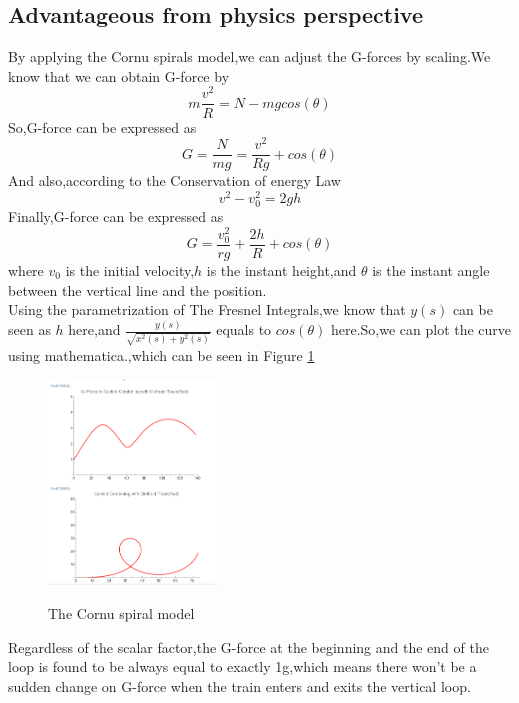 \documentclass{article}
\begin{document}
\subsection{Advantageous from  physics perspective}
By applying the Cornu spirals model,we can adjust the G-forces by scaling.We know that we can obtain G-force by
\begin{equation}
    m\frac{v^2}{R}=N-mgcos(\theta)
\end{equation}
So,G-force can be expressed as
\begin{equation}
    G=\frac{N}{mg}=\frac{v^2}{Rg}+cos(\theta)
\end{equation}
And also,according to the Conservation of energy Law
\begin{equation}
    v^2-v_{0}^2=2gh
\end{equation}
Finally,G-force can be expressed as 
\begin{equation}
    G=\frac{v_{0}^2}{rg}+\frac{2h}{R}+cos(\theta)
\end{equation}
where $v_{0}$ is the initial velocity,$h$ is the instant height,and $\theta$ is the instant angle between the vertical line and the position.\\
Using the parametrization of The Fresnel Integrals,we know that $y(s)$ can be seen as $h$ here,and $\frac{y(s)}{\sqrt{x^2(s)+y^2(s)}}$ equals to $cos(\theta)$ here.So,we can plot the curve using mathematica.,which can be seen in Figure \ref{3}
\begin{figure}[H]
        \centering
        \includegraphics[width=0.4\textwidth]{clothoid_model.png}
        \label{3}
        \caption{The Cornu spiral model}
    \end{figure}
Regardless of the  scalar factor,the G-force at the beginning and the end of the loop is found to be always equal to exactly 1g,which means there won't be a sudden change on G-force when the train enters and exits the vertical loop.\\
\end{document}

